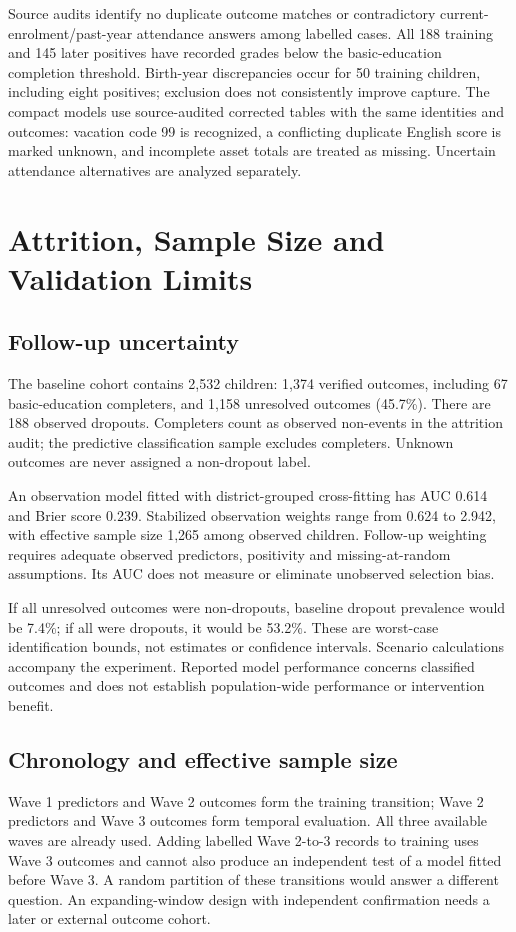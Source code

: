 \documentclass[conference,a4paper]{IEEEtran}
\begin{document}
Source audits identify no duplicate outcome matches or contradictory current-enrolment/past-year attendance answers among labelled cases. All 188 training and 145 later positives have recorded grades below the basic-education completion threshold. Birth-year discrepancies occur for 50 training children, including eight positives; exclusion does not consistently improve capture. The compact models use source-audited corrected tables with the same identities and outcomes: vacation code 99 is recognized, a conflicting duplicate English score is marked unknown, and incomplete asset totals are treated as missing. Uncertain attendance alternatives are analyzed separately.

\section{\textbf{Attrition, Sample Size and Validation Limits}}
\subsection{\textbf{Follow-up uncertainty}}
The baseline cohort contains 2,532 children: 1,374 verified outcomes, including 67 basic-education completers, and 1,158 unresolved outcomes (45.7\%). There are 188 observed dropouts. Completers count as observed non-events in the attrition audit; the predictive classification sample excludes completers. Unknown outcomes are never assigned a non-dropout label.

An observation model fitted with district-grouped cross-fitting has AUC 0.614 and Brier score 0.239. Stabilized observation weights range from 0.624 to 2.942, with effective sample size 1,265 among observed children. Follow-up weighting requires adequate observed predictors, positivity and missing-at-random assumptions. Its AUC does not measure or eliminate unobserved selection bias.

If all unresolved outcomes were non-dropouts, baseline dropout prevalence would be 7.4\%; if all were dropouts, it would be 53.2\%. These are worst-case identification bounds, not estimates or confidence intervals. Scenario calculations accompany the experiment. Reported model performance concerns classified outcomes and does not establish population-wide performance or intervention benefit.

\subsection{\textbf{Chronology and effective sample size}}
Wave 1 predictors and Wave 2 outcomes form the training transition; Wave 2 predictors and Wave 3 outcomes form temporal evaluation. All three available waves are already used. Adding labelled Wave 2-to-3 records to training uses Wave 3 outcomes and cannot also produce an independent test of a model fitted before Wave 3. A random partition of these transitions would answer a different question. An expanding-window design with independent confirmation needs a later or external outcome cohort.
\end{document}
